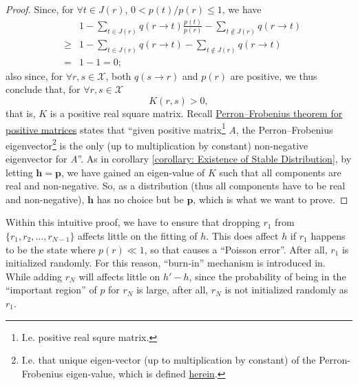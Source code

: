 \documentclass{article}
\newcommand{\nin}{\not\in}
\newcommand{\tmmathbf}[1]{\ensuremath{\boldsymbol{#1}}}
\newcommand{\tmtextit}[1]{{\itshape{#1}}}
\begin{document}
\begin{proof}
  Since, for $\forall t \in J ( r )$, $0<p ( t ) /p ( r ) \leqslant 1$, we
  have
  \begin{eqnarray*}
    &  & 1- \sum_{t \in J ( r )}  q ( r \rightarrow t )   \frac{p ( t )}{p (
    r )} - \sum_{t \nin J ( r )} q ( r \rightarrow t )\\
    & \geqslant & 1- \sum_{t \in J ( r )}  q ( r \rightarrow t ) - \sum_{t
    \nin J ( r )} q ( r \rightarrow t )\\
    & = & 1-1=0;
  \end{eqnarray*}
  also since, for $\forall r,s \in \mathcal{X}$, both $q ( s \rightarrow r )$
  and $p ( r )$ are positive, we thus conclude that, for $\forall r,s \in
  \mathcal{X}$
  \[ K ( r,s ) >0, \]
  that is, $K$ is a positive real square matrix. Recall
  \href{https://en.wikipedia.org/wiki/Perron{\textendash}Frobenius_theorem#No_other_non-negative_eigenvectors}{Perron--Frobenius
  theorem for positive matrices} states that ``given positive
  matrix\footnote{I.e. positive real squre matrix.} \tmtextit{A}, the
  Perron--Frobenius eigenvector\footnote{I.e. that unique eigen-vector (up to
  multiplication by constant) of the Perron-Frobenius eigen-value, which is
  defined
  \href{https://en.wikipedia.org/wiki/Perron{\textendash}Frobenius_theorem#Positive_matrices}{herein}.}
  is the only (up to multiplication by constant) non-negative eigenvector for
  \tmtextit{A}''. As in corollary \ref{corollary: Existence of Stable
  Distribution}, by letting $\tmmathbf{h}=\tmmathbf{p}$, we have gained an
  eigen-value of $K$ such that all components are real and non-negative. So,
  as a distribution (thus all components have to be real and non-negative),
  $\tmmathbf{h}$ has no choice but be $\tmmathbf{p}$, which is what we want to
  prove.
\end{proof}

\begin{remark}
  [Burn-in]
  
  Within this intuitive proof, we have to ensure that dropping $r_{1}$ from
  $\{ r_{1} ,r_{2} , \ldots ,r_{N-1} \}$ affects little on the fitting of $h$.
  This does affect $h$ if $r_{1}$ happens to be the state where $p ( r ) \ll
  1$, so that causes a ``Poisson error''. After all, $r_{1}$ is initialized
  randomly. For this reason, ``burn-in'' mechanism is introduced in. While
  adding $r_{N}$ will affects little on $h' -h$, since the probability of
  being in the ``important region'' of $p$ for $r_{N}$ is large, after all,
  $r_{N}$ is not initialized randomly as $r_{1}$.
\end{remark}
\end{document}
